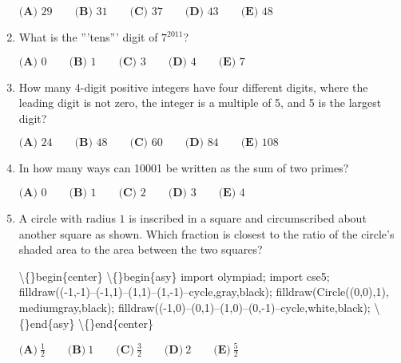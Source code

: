 \documentclass{article}
\begin{document}
\begin{enumerate}[label=\arabic*., itemsep=0.5em]
\( \textbf{(A) }29\qquad\textbf{(B) }31\qquad\textbf{(C) }37\qquad\textbf{(D) }43\qquad\textbf{(E) }48 \)\par \vspace{0.5em}\item What is the '''tens''' digit of \(7^{2011}\)?

\( \textbf{(A) }0\qquad\textbf{(B) }1\qquad\textbf{(C) }3\qquad\textbf{(D) }4\qquad\textbf{(E) }7 \)\par \vspace{0.5em}\item How many 4-digit positive integers have four different digits, where the leading digit is not zero, the integer is a multiple of 5, and 5 is the largest digit?

\( \textbf{(A) }24\qquad\textbf{(B) }48\qquad\textbf{(C) }60\qquad\textbf{(D) }84\qquad\textbf{(E) }108 \)\par \vspace{0.5em}\item In how many ways can 10001 be written as the sum of two primes?

\( \textbf{(A) }0\qquad\textbf{(B) }1\qquad\textbf{(C) }2\qquad\textbf{(D) }3\qquad\textbf{(E) }4 \)\par \vspace{0.5em}\item A circle with radius \(1\) is inscribed in a square and circumscribed about another square as shown. Which fraction is closest to the ratio of the circle's shaded area to the area between the two squares?


\textbackslash\{\}begin\{center\}
\textbackslash\{\}begin\{asy\}
import olympiad;
import cse5;
filldraw((-1,-1)--(-1,1)--(1,1)--(1,-1)--cycle,gray,black);
filldraw(Circle((0,0),1), mediumgray,black);
filldraw((-1,0)--(0,1)--(1,0)--(0,-1)--cycle,white,black);
\textbackslash\{\}end\{asy\}
\textbackslash\{\}end\{center\}


\( \textbf{(A)}\ \frac{1}2\qquad\textbf{(B)}\ 1\qquad\textbf{(C)}\ \frac{3}2\qquad\textbf{(D)}\ 2\qquad\textbf{(E)}\ \frac{5}2 \)\par \vspace{0.5em}\end{enumerate}
\end{document}
